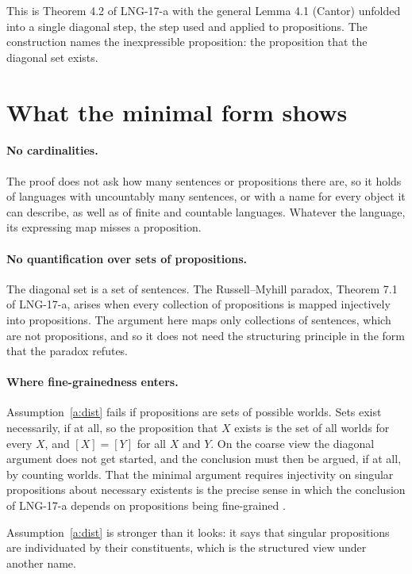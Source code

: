 \documentclass{situationist-preprint}
\begin{document}
This is Theorem 4.2 of LNG-17-a with the general Lemma 4.1 (Cantor) unfolded into a single diagonal step, the step \citet{Cantor1891} used and \citet[Appendix~B]{Russell1903} applied to propositions. The construction names the inexpressible proposition: the proposition that the diagonal set exists.

\section{What the minimal form shows}

\paragraph{No cardinalities.} The proof does not ask how many sentences or propositions there are, so it holds of languages with uncountably many sentences, or with a name for every object it can describe, as well as of finite and countable languages. Whatever the language, its expressing map misses a proposition.

\paragraph{No quantification over sets of propositions.} The diagonal set is a set of sentences. The Russell--Myhill paradox, Theorem 7.1 of LNG-17-a, arises when every collection of propositions is mapped injectively into propositions. The argument here maps only collections of sentences, which are not propositions, and so it does not need the structuring principle in the form that the paradox refutes.

\paragraph{Where fine-grainedness enters.} Assumption~\ref{a:dist} fails if propositions are sets of possible worlds. Sets exist necessarily, if at all, so the proposition that $X$ exists is the set of all worlds for every $X$, and $[X] = [Y]$ for all $X$ and $Y$. On the coarse view the diagonal argument does not get started, and the conclusion must then be argued, if at all, by counting worlds. That the minimal argument requires injectivity on singular propositions about necessary existents is the precise sense in which the conclusion of LNG-17-a depends on propositions being fine-grained \citep{King2007}.

\begin{objection}
Assumption~\ref{a:dist} is stronger than it looks: it says that singular propositions are individuated by their constituents, which is the structured view under another name.
\end{objection}
\end{document}
